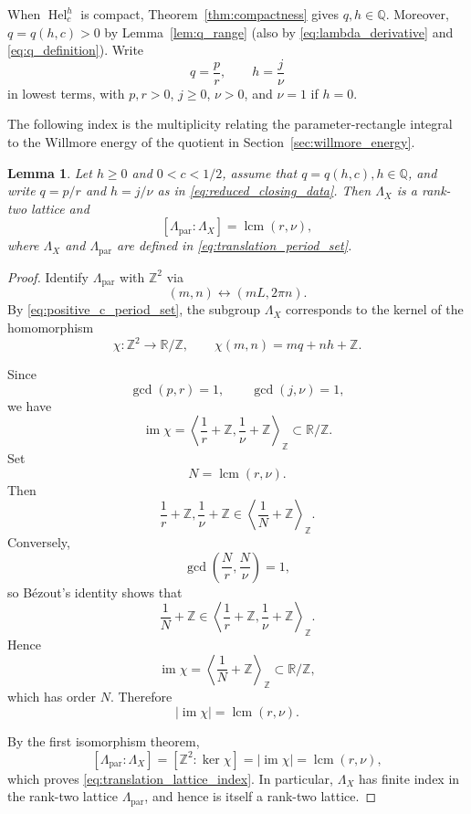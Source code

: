 \documentclass[a4paper,11pt]{amsart}
\numberwithin{equation}{section}
\theoremstyle{plain}
\newtheorem{lem}[thm]{Lemma}
\begin{document}
When $\operatorname{Hel}_c^h$ is compact,
Theorem~\ref{thm:compactness} gives $q,h\in\mathbb Q$. Moreover,
$q=q(h,c)>0$ by Lemma~\ref{lem:q_range} (also by \eqref{eq:lambda_derivative} and
\eqref{eq:q_definition}). Write
\begin{equation}\label{eq:reduced_closing_data}
q=\frac{p}{r},
\qquad
h=\frac{j}{\nu}
\end{equation}
in lowest terms, with $p,r>0$, $j\geq0$, $\nu>0$, and
$\nu=1$ if $h=0$.

The following index is the multiplicity relating the
parameter-rectangle integral to the Willmore energy of the quotient in
Section~\ref{sec:willmore_energy}.

\begin{lem}\label{lem:period_lattice_index}
Let $h\geq0$ and $0<c<1/2$, assume that $q=q(h,c),h\in\mathbb Q$, and
write $q=p/r$ and $h=j/\nu$ as in
\eqref{eq:reduced_closing_data}. Then $\Lambda_X$ is a rank-two lattice
and
\begin{equation}\label{eq:translation_lattice_index}
[\Lambda_{\mathrm{par}}:\Lambda_X]
=
\operatorname{lcm}(r,\nu),
\end{equation}
where $\Lambda_X$ and $\Lambda_{\mathrm{par}}$ are defined in
\eqref{eq:translation_period_set}.
\end{lem}

\begin{proof}
Identify $\Lambda_{\mathrm{par}}$ with $\mathbb Z^2$ via
\[
(m,n)\longleftrightarrow(mL,2\pi n).
\]
By \eqref{eq:positive_c_period_set}, the subgroup $\Lambda_X$
corresponds to the kernel of the homomorphism
\[
\chi:\mathbb Z^2\longrightarrow\mathbb R/\mathbb Z,
\qquad
\chi(m,n)=mq+nh+\mathbb Z.
\]

 Since
\[
\gcd(p,r)=1,
\qquad
\gcd(j,\nu)=1,
\]
we have
\[
\operatorname{im}\chi
=
\left\langle
\frac{1}{r}+\mathbb Z,
\frac{1}{\nu}+\mathbb Z
\right\rangle_{\mathbb Z}\subset \mathbb R/\mathbb Z.
\]
Set
\[
N=\operatorname{lcm}(r,\nu).
\]
Then
\[
\frac{1}{r}+\mathbb Z,
\frac{1}{\nu}+\mathbb Z
\in
\left\langle
\frac{1}{N}+\mathbb Z
\right\rangle_{\mathbb Z}.
\]
Conversely,
\[
\gcd\left(\frac{N}{r},\frac{N}{\nu}\right)=1,
\]
so B\'ezout's identity shows that
\[
\frac{1}{N}+\mathbb Z
\in
\left\langle
\frac{1}{r}+\mathbb Z,
\frac{1}{\nu}+\mathbb Z
\right\rangle_{\mathbb Z}.
\]
Hence
\[
\operatorname{im}\chi
=
\left\langle
\frac{1}{N}+\mathbb Z
\right\rangle_{\mathbb Z}\subset \mathbb R/\mathbb Z,
\]
which has order $N$. Therefore
\[
|\operatorname{im}\chi|
=
\operatorname{lcm}(r,\nu).
\]

By the first isomorphism theorem,
\[
[\Lambda_{\mathrm{par}}:\Lambda_X]
=
[\mathbb Z^2:\ker\chi]
=
|\operatorname{im}\chi|
=
\operatorname{lcm}(r,\nu),
\]
which proves \eqref{eq:translation_lattice_index}. In particular,
$\Lambda_X$ has finite index in the rank-two lattice
$\Lambda_{\mathrm{par}}$, and hence is itself a rank-two lattice.
\end{proof}
\end{document}
